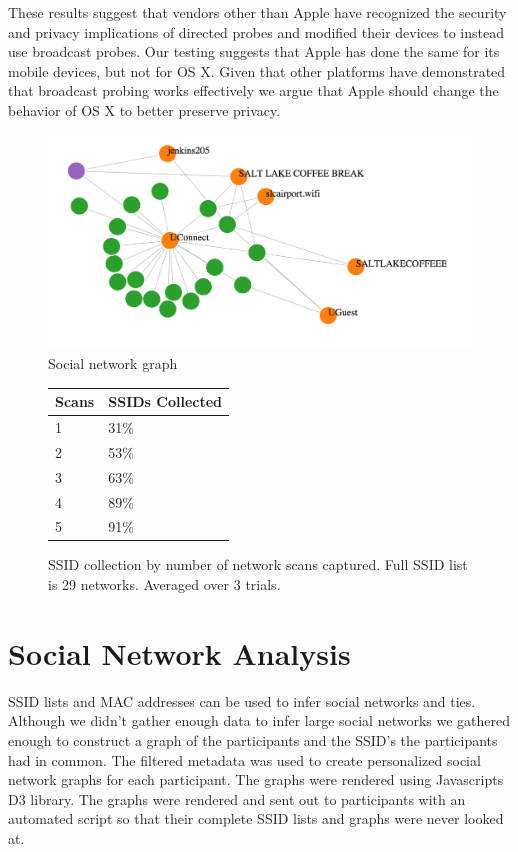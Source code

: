 \documentclass[letterpaper,twocolumn,10pt]{article}
\begin{document}
These results suggest that vendors other than Apple have recognized the security and privacy implications of directed probes and modified their devices to instead use broadcast probes. Our testing suggests that Apple has done the same for its mobile devices, but not for OS X. Given that other platforms have demonstrated that broadcast probing works effectively we argue that Apple should change the behavior of OS X to better preserve privacy.
\begin{figure}
\centering
\includegraphics[scale=.5]{graph.png}
\caption{\textsf{Social network graph}}
\end{figure}
\begin{figure}
\centering
\begin{tabular}{l | l}
Scans & SSIDs Collected \\ 
\hline
1 & 31\% \\
2 & 53\% \\
3 & 63\% \\
4 & 89\% \\
5 & 91\% \\
\end{tabular}
\caption{SSID collection by number of network scans captured. Full SSID list is 29 networks. Averaged over 3 trials.}
\end{figure}


\section{Social Network Analysis}

SSID lists and MAC addresses can be used to infer social networks and ties\cite{cheng}. Although we didn't gather enough data to infer large social networks we gathered enough to construct a graph of the participants and the SSID's the participants had in common. The filtered metadata was used to create personalized social network graphs for each participant. The graphs were rendered using Javascripts D3 library. The graphs were rendered and sent out to participants with an automated script so that their complete SSID lists and graphs were never looked at. 
\end{document}
